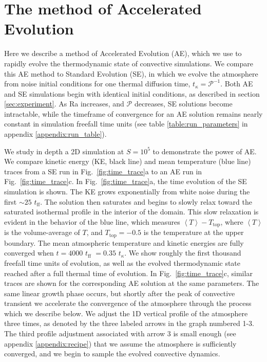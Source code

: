 \documentclass[aps, pre, onecolumn, nofootinbib, notitlepage, groupedaddress, amsfonts, amssymb, amsmath, longbibliography]{revtex4-1}
\newcommand{\angles}[1]{\ensuremath{\left\langle #1 \right\rangle}}
\begin{document}

\section{The method of Accelerated Evolution}
\label{sec:ae}
Here we describe a method of Accelerated Evolution (AE), which we use 
to rapidly evolve the thermodynamic state of convective simulations.  
We compare this AE method to Standard Evolution
(SE), in which we evolve the atmosphere from noise initial conditions
for one thermal diffusion time,
$t_\kappa = \mathcal{P}^{-1}$. Both AE and SE simulations begin with identical
initial conditions, as described in section \ref{sec:experiment}.
As Ra increases, and $\mathcal{P}$ decreases, SE solutions become intractable, 
while the timeframe of convergence for an AE solution remains nearly constant
in simulation freefall time units (see table \ref{table:run_parameters} in
appendix \ref{appendix:run_table}).

We study in depth a 2D simulation at $S = 10^5$ to demonstrate the power of AE.
We compare kinetic energy (KE, black line) and mean temperature (blue line)
traces from a SE run in Fig.~\ref{fig:time_trace}a to an AE run
in Fig.~\ref{fig:time_trace}c.
In Fig.~\ref{fig:time_trace}a, the time evolution of the SE simulation is shown.
The KE grows exponentially from white noise during the
first $\sim 25$ $t_{\text{ff}}$. The solution then saturates and begins to slowly
relax toward the saturated isothermal profile in the interior of the domain.
This slow relaxation is evident in the behavior of the blue line, which measures
$\angles{T} - T_{\text{top}}$, where \angles{T} is the volume-average of $T$, and
$T_{\text{top}} = -0.5$ is the temperature at the upper boundary.
The mean atmospheric temperature and
kinetic energies are fully converged when $t = 4000$ $t_{\text{ff}}$ $= 0.35$ $t_{\kappa}$.
We show roughly the first thousand freefall time
units of evolution, as well as the evolved thermodynamic state reached after a full
thermal time of evolution.  In Fig.~\ref{fig:time_trace}c, similar traces are
shown for the corresponding AE solution
at the same parameters. The same linear growth phase occurs, but shortly after
the peak of convective transient we accelerate the convergence of the atmosphere
through the process which we describe below. We adjust the 1D vertical profile of
the atmosphere three times, as denoted by the three labeled
arrows in the graph numbered 1-3.  The third profile adjustment associated with
arrow 3 is small enough (see appendix \ref{appendix:recipe}) that we assume
the atmosphere is sufficiently converged, and we begin to sample the evolved
convective dynamics.
\end{document}
